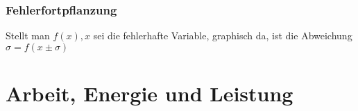 \documentclass[a4paper,12pt]{scrartcl}
\begin{document}
\subsubsection{Fehlerfortpflanzung} \label{sec:Fehlerfortphlanzung}
Stellt man $f(x), x$ sei die fehlerhafte Variable, graphisch da, ist die Abweichung $\sigma = f(x \pm \sigma)$



\section{Arbeit, Energie und Leistung}
\end{document}
